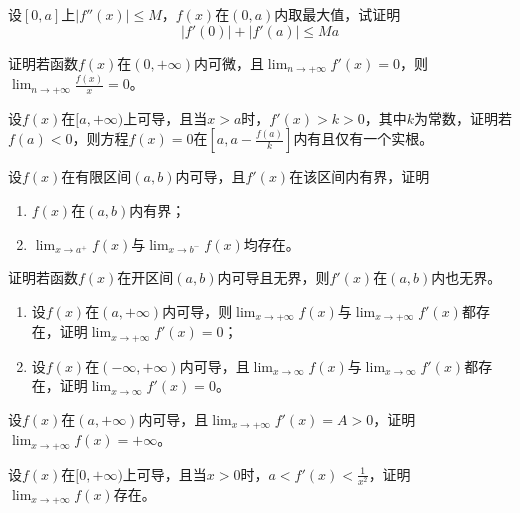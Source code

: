 \begin{example}
	设$[0,a]$上$|f''(x)|\leqslant M$，$f(x)$在$(0,a)$内取最大值，试证明\[|f'(0)|+|f'(a)|\leqslant Ma\]
\end{example}

\begin{example}
	证明若函数$f(x)$在$(0,+\infty)$内可微，且$\lim_{n\to+\infty}f'(x)=0$，则$\lim_{n\to+\infty}\frac{f(x)}{x}=0$。
\end{example}

\begin{example}
	设$f(x)$在$[a,+\infty)$上可导，且当$x>a$时，$f'(x)>k>0$，其中$k为常数$，证明若$f(a)<0$，则方程$f(x)=0$在$[a,a-\frac{f(a)}{k}]$内有且仅有一个实根。
\end{example}

\begin{example}
	设$f(x)$在有限区间$(a,b)$内可导，且$f'(x)$在该区间内有界，证明
	\begin{enumerate}
		\item $f(x)$在$(a,b)$内有界；
		\item $\lim_{x\to a^+}f(x)$与$\lim_{x\to b^-}f(x)$均存在。
	\end{enumerate}
\end{example}

\begin{example}
	证明若函数$f(x)$在开区间$(a,b)$内可导且无界，则$f'(x)$在$(a,b)$内也无界。
\end{example}

\begin{example}
	\begin{enumerate}
		\item 设$f(x)$在$(a,+\infty)$内可导，则$\lim_{x\to+\infty}f(x)$与$\lim_{x\to+\infty}f'(x)$都存在，证明$\lim_{x\to+\infty}f'(x)=0$；
		\item 设$f(x)$在$(-\infty,+\infty)$内可导，且$\lim_{x\to\infty}f(x)$与$\lim_{x\to\infty}f'(x)$都存在，证明$\lim_{x\to\infty}f'(x)=0$。
	\end{enumerate}
\end{example}

\begin{example}
	设$f(x)$在$(a,+\infty)$内可导，且$\lim_{x\to+\infty}f'(x)=A>0$，证明$\lim_{x\to+\infty}f(x)=+\infty$。
\end{example}

\begin{example}
	设$f(x)$在$[0,+\infty)$上可导，且当$x>0$时，$a<f'(x)<\frac{1}{x^2}$，证明$\lim_{x\to+\infty}f(x)$存在。
\end{example}

